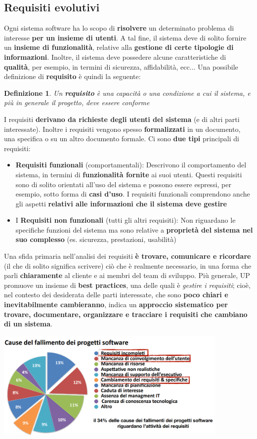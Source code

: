 \documentclass[12pt]{article}
\newtheorem{Definizione}{Definizione}[subsection]
\begin{document}
\subsection{Requisiti evolutivi}
Ogni sistema software ha lo scopo di \textbf{risolvere} un determinato problema di interesse \textbf{per un insieme di utenti}.
A tal fine, il sistema deve di solito fornire un \textbf{insieme di funzionalità}, relative alla \textbf{gestione di certe tipologie di informazioni}.
Inoltre, il sistema deve possedere alcune caratteristiche di \textbf{qualità}, per esempio, in termini di sicurezza, affidabilità, ecc... 
Una possibile definizione di \textbf{requisito} è quindi la seguente:
\begin{Definizione}
    Un \textbf{requisito} è una capacità o una condizione a cui il sistema, e più in generale il progetto, deve essere conforme
\end{Definizione}
I requisiti \textbf{derivano da richieste degli utenti del sistema} (e di altri parti interessate).
Inoltre i requisiti vengono spesso \textbf{formalizzati} in un documento, una specifica o su un altro documento formale.
Ci sono \textbf{due tipi} principali di requisiti:
\begin{itemize}
    \item \textbf{Requisiti funzionali} (comportamentali): Descrivono il comportamento del sistema, in termini di \textbf{funzionalità fornite} ai suoi utenti.
    Questi requisiti sono di solito orientati all'uso del sistema e possono essere espressi, per esempio, sotto forma di \textbf{casi d'uso}.
    I requisiti funzionali comprendono anche gli aspetti \textbf{relativi alle informazioni che il sistema deve gestire}
    \item I \textbf{Requisiti non funzionali} (tutti gli altri requisiti): Non riguardano le specifiche funzioni del sistema ma sono relative a \textbf{proprietà del sistema nel suo complesso}
    (es. sicurezza, prestazioni, usabilità) 
\end{itemize} 
Una sfida primaria nell'analisi dei requisiti \textbf{è trovare, comunicare e ricordare} (il che di solito significa scrivere) ciò che è realmente necessario, in una forma che parli \textbf{chiaramente} al cliente e ai membri del team di sviluppo.
Più generale, UP promuove un insieme di \textbf{best practices}, una delle quali è \textit{gestire i requisiti}; cioè, nel contesto dei desiderata delle parti interessate,  che sono \textbf{poco chiari e inevitabilmente cambieranno}, indica un \textbf{approccio sistematico per trovare, documentare, organizzare e tracciare i requisiti che cambiano di un sistema}.
\begin{center}
    \includegraphics[width = 0.85\textwidth]{Images/27.png}
\end{center}
\end{document}

